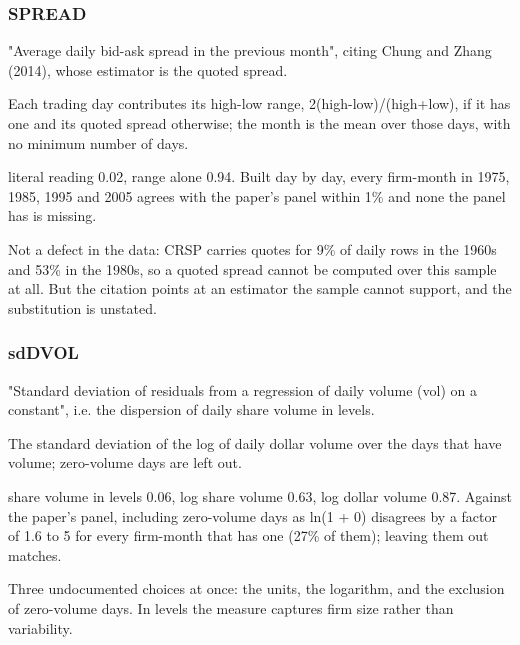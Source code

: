 \documentclass[11pt]{article}
\begin{document}
\subsubsection*{SPREAD}
\begin{description}[leftmargin=2.4cm,labelwidth=2.2cm,font=\normalfont\bfseries,style=sameline]
\item[Documented:] "Average daily bid-ask spread in the previous month", citing Chung and Zhang (2014), whose estimator is the quoted spread.
\item[Implemented:] Each trading day contributes its high-low range, 2(high-low)/(high+low), if it has one and its quoted spread otherwise; the month is the mean over those days, with no minimum number of days.
\item[Evidence:] literal reading 0.02, range alone 0.94. Built day by day, every firm-month in 1975, 1985, 1995 and 2005 agrees with the paper's panel within 1\% and none the panel has is missing.
\item[Why it matters:] Not a defect in the data: CRSP carries quotes for 9\% of daily rows in the 1960s and 53\% in the 1980s, so a quoted spread cannot be computed over this sample at all. But the citation points at an estimator the sample cannot support, and the substitution is unstated.
\end{description}
\subsubsection*{sdDVOL}
\begin{description}[leftmargin=2.4cm,labelwidth=2.2cm,font=\normalfont\bfseries,style=sameline]
\item[Documented:] "Standard deviation of residuals from a regression of daily volume (vol) on a constant", i.e. the dispersion of daily share volume in levels.
\item[Implemented:] The standard deviation of the log of daily dollar volume over the days that have volume; zero-volume days are left out.
\item[Evidence:] share volume in levels 0.06, log share volume 0.63, log dollar volume 0.87. Against the paper's panel, including zero-volume days as ln(1 + 0) disagrees by a factor of 1.6 to 5 for every firm-month that has one (27\% of them); leaving them out matches.
\item[Why it matters:] Three undocumented choices at once: the units, the logarithm, and the exclusion of zero-volume days. In levels the measure captures firm size rather than variability.
\end{description}
\end{document}
